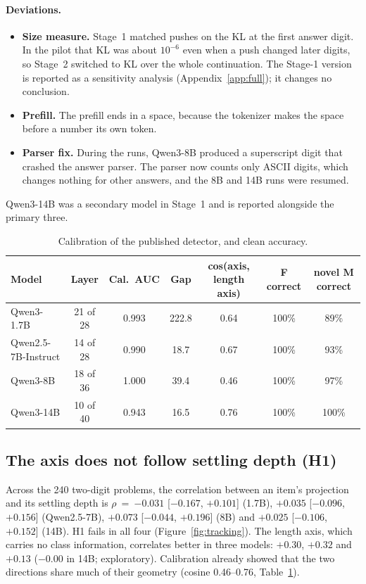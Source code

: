 \documentclass[11pt]{article}
\begin{document}
\paragraph{Deviations.}
\begin{itemize}
  \item \textbf{Size measure.} Stage~1 matched pushes on the KL at the first answer digit. In the pilot that KL was about $10^{-6}$ even when a push changed later digits, so Stage~2 switched to KL over the whole continuation. The Stage-1 version is reported as a sensitivity analysis (Appendix~\ref{app:full}); it changes no conclusion.
  \item \textbf{Prefill.} The prefill ends in a space, because the tokenizer makes the space before a number its own token.
  \item \textbf{Parser fix.} During the runs, Qwen3-8B produced a superscript digit that crashed the answer parser. The parser now counts only ASCII digits, which changes nothing for other answers, and the 8B and 14B runs were resumed.
\end{itemize}
Qwen3-14B was a secondary model in Stage~1 and is reported alongside the primary three.

\begin{table}[ht]
\caption{Calibration of the published detector, and clean accuracy.}
\label{tab:cal}
\vspace{4pt}
\centering
\small
\begin{tabular}{@{}lcccccc@{}}
\toprule
Model & Layer & Cal.\ AUC & Gap & cos(axis, length axis) & F correct & novel M correct \\
\midrule
Qwen3-1.7B & 21 of 28 & 0.993 & 222.8 & 0.64 & 100\% & 89\% \\
Qwen2.5-7B-Instruct & 14 of 28 & 0.990 & 18.7 & 0.67 & 100\% & 93\% \\
Qwen3-8B & 18 of 36 & 1.000 & 39.4 & 0.46 & 100\% & 97\% \\
Qwen3-14B & 10 of 40 & 0.943 & 16.5 & 0.76 & 100\% & 100\% \\
\bottomrule
\end{tabular}
\end{table}

\subsection{The axis does not follow settling depth (H1)}

Across the 240 two-digit problems, the correlation between an item's projection and its settling depth is $\rho$~=~$-0.031$ [$-0.167$, $+0.101$] (1.7B), $+0.035$ [$-0.096$, $+0.156$] (Qwen2.5-7B), $+0.073$ [$-0.044$, $+0.196$] (8B) and $+0.025$ [$-0.106$, $+0.152$] (14B). H1 fails in all four (Figure~\ref{fig:tracking}). The length axis, which carries no class information, correlates better in three models: $+0.30$, $+0.32$ and $+0.13$ ($-0.00$ in 14B; exploratory). Calibration already showed that the two directions share much of their geometry (cosine 0.46--0.76, Table~\ref{tab:cal}).
\end{document}
